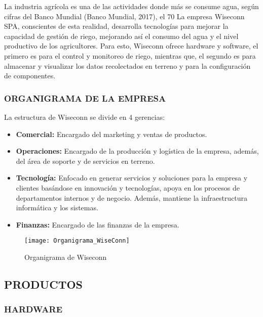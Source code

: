 La industria agrícola es una de las actividades donde más se consume agua, según cifras del Banco Mundial (Banco Mundial, 2017), el 70%
La empresa Wiseconn SPA, conscientes de esta realidad, desarrolla tecnologías para mejorar la capacidad de gestión de riego, mejorando así el consumo del agua y el nivel productivo de los agricultores. Para esto, Wiseconn ofrece hardware y software, el primero es para el control y monitoreo de riego, mientras que, el segundo es para almacenar y visualizar los datos recolectados en terreno y para la configuración de componentes.

\subsubsection{ORGANIGRAMA DE LA EMPRESA}

La estructura de Wiseconn se divide en 4 gerencias:
\begin{itemize}
	\item \textbf{Comercial:} Encargado del marketing y ventas de productos.
	\item \textbf{Operaciones:} Encargado de la producción y logística de la empresa, además, del área de soporte y de servicios en terreno.
	\item \textbf{Tecnología:} Enfocado en generar servicios y soluciones para la empresa y clientes basándose en innovación y tecnologías, apoya en los procesos de departamentos internos y de negocio. Además, mantiene la infraestructura informática y los sistemas.
	\item \textbf{Finanzas:} Encargado de las finanzas de la empresa.
\end{itemize}

\begin{figure}[h]
	\centering
	\texttt{[image: Organigrama\_WiseConn]}
	\caption{\label{fig:orgwis} Organigrama de Wiseconn}
\end{figure}

\subsection{PRODUCTOS}
\subsubsection{HARDWARE}

